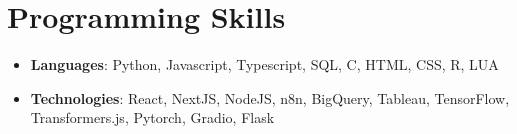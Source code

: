 \documentclass[letterpaper,10.8pt]{article}
\newcommand{\resumeSubHeadingListStart}{\begin{itemize}[leftmargin=*]}
\newcommand{\resumeSubHeadingListEnd}{\end{itemize}}
\begin{document}
\section*{Programming Skills}
\resumeSubHeadingListStart
  \item{
    \textbf{Languages}{: Python, Javascript, Typescript, SQL, C, HTML, CSS, R, LUA}
  }
  \item{
    \textbf{Technologies}{: React, NextJS, NodeJS, n8n, BigQuery, Tableau, TensorFlow, Transformers.js, Pytorch, Gradio, Flask}
  }
\resumeSubHeadingListEnd
\end{document}

